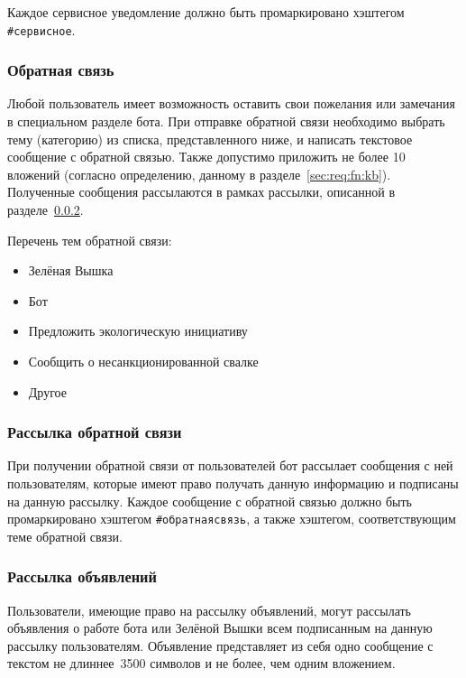     Каждое сервисное уведомление должно быть промаркировано хэштегом \hbox{\texttt{\#сервисное}}.

\subsubsection{Обратная связь}
    \label{sec:req:fn:feedback}
    Любой пользователь имеет возможность оставить свои пожелания или замечания в специальном
    разделе бота. При отправке обратной связи необходимо выбрать тему (категорию) из списка,
    представленного ниже, и написать текстовое сообщение с обратной связью.
    Также допустимо приложить не более 10 вложений (согласно определению, данному в
    разделе~\ref{sec:req:fn:kb}). Полученные сообщения рассылаются в рамках рассылки,
    описанной в разделе~\ref{sec:req:fn:feedbacknl}.

    Перечень тем обратной связи:
    \begin{itemize}
        \item
            Зелёная Вышка
        \item
            Бот
        \item
            Предложить экологическую инициативу
        \item
            Сообщить о несанкционированной свалке
        \item
            Другое
    \end{itemize}

\subsubsection{Рассылка обратной связи}
    \label{sec:req:fn:feedbacknl}
    При получении обратной связи от пользователей бот рассылает сообщения с ней пользователям,
    которые имеют право получать данную информацию и подписаны на данную рассылку.
    Каждое сообщение с обратной связью должно быть промаркировано хэштегом \hbox{\texttt{\#обратнаясвязь}},
    а также хэштегом, соответствующим теме обратной связи.

\subsubsection{Рассылка объявлений}
    \label{sec:req:fn:announce}
    Пользователи, имеющие право на рассылку объявлений, могут
    рассылать объявления о работе бота или Зелёной Вышки всем подписанным на данную рассылку
    пользователям. Объявление представляет из себя одно сообщение с текстом не длиннее~3500 символов
    и не более, чем одним вложением.

